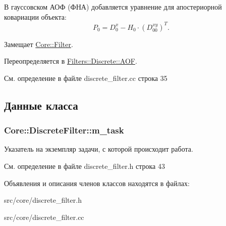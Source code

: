 В гауссовском АОФ (ФНА) добавляется уравнение для апостериорной ковариации объекта\+: \[P_0 = D_0^x - H_0 \cdot (D_{00}^{xy})^T.\] 

Замещает \hyperlink{class_core_1_1_filter_af95880b734c4b8dc3d8c02f222b32506}{Core\+::\+Filter}.



Переопределяется в \hyperlink{class_filters_1_1_discrete_1_1_a_o_f_aa822fe74d7ca160f898db1c1289e17f7}{Filters\+::\+Discrete\+::\+A\+OF}.



См. определение в файле discrete\+\_\+filter.\+cc строка 35



\subsection{Данные класса}
\subsubsection[{\texorpdfstring{m\+\_\+task}{m_task}}]{ Core\+::\+Discrete\+Filter\+::m\+\_\+task\hspace{0.3cm}{\ttfamily [protected]}}\hypertarget{class_core_1_1_discrete_filter_a6a2d67be8eaa0df383fe080474975faa}{}\label{class_core_1_1_discrete_filter_a6a2d67be8eaa0df383fe080474975faa}
Указатель на экземпляр задачи, с которой происходит работа. 

См. определение в файле discrete\+\_\+filter.\+h строка 43



Объявления и описания членов классов находятся в файлах\+:\begin{DoxyCompactItemize}
\item 
src/core/discrete\+\_\+filter.\+h\item 
src/core/discrete\+\_\+filter.\+cc\end{DoxyCompactItemize}
